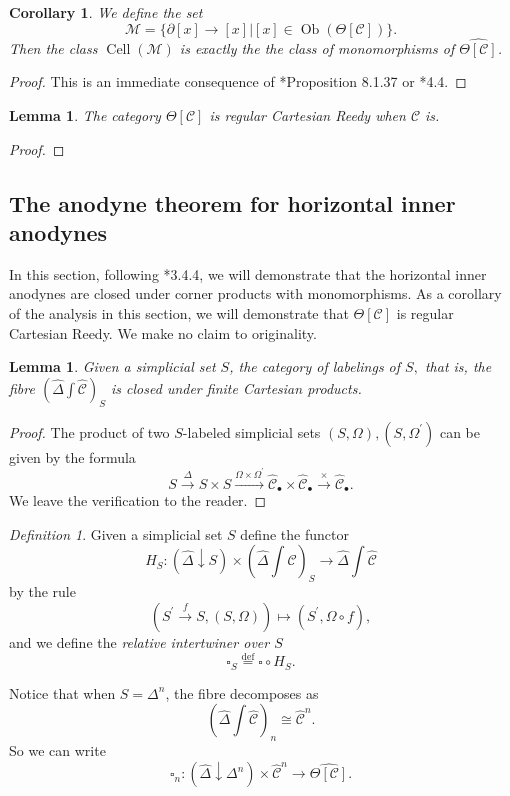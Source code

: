 \documentclass[leqno]{article}
\numberwithin{equation}{subsection}
\theoremstyle{plain}   %
\newtheorem{cor}[equation]{Corollary}
\newtheorem{lemma}[equation]{Lemma}
\theoremstyle{remark}
\newtheorem{defn}[equation]{Definition}
\theoremstyle{plain}
\DeclareMathOperator{\Ob}{Ob}
\newcommand{\overcat}[2]{{\left(#1\downarrow #2\right)}}
\newcommand{\psh}[1]{\ensuremath{\widehat{#1}}}
\renewcommand{\C}{\ensuremath{\mathcal{C}}}
\newcommand{\defeq}{\overset{\mathrm{def}}=}
\newcommand{\cellset}{\ensuremath{\widehat{\Theta[\mathcal{C}]}}}
\newcommand{\ssetlab}{\ensuremath{\widehat{\Delta} \int \widehat{\mathcal{C}}}}
\begin{document}
\begin{cor} 
	We define the set
	\[\mathscr{M}=\{\partial[x] \to [x]| [x]\in \Ob(\Theta[\C])\}.\]  Then the class \(\operatorname{Cell}(\mathscr{M})\) is exactly the the class of monomorphisms of \(\cellset\).  
\end{cor}
\begin{proof}
	This is an immediate consequence of \cite{cisinski-book}*{Proposition 8.1.37} or \cite{bergner-rezk-reedy}*{4.4}.
\end{proof}
\begin{lemma} The category \(\Theta[\C]\) is regular Cartesian Reedy when \(\C\) is.
\end{lemma}
\begin{proof}
\end{proof}

\subsection{The anodyne theorem for horizontal inner anodynes}\label{horizontal}
In this section, following \cite{oury}*{3.4.4}, we will demonstrate that the horizontal inner anodynes are closed under corner products with monomorphisms.  As a corollary of the analysis in this section, we will demonstrate that \(\Theta[\C]\) is regular Cartesian Reedy.  We make no claim to originality.

\begin{lemma} Given a simplicial set \(S\), the category of labelings of \(S,\) that is, the fibre \(\left(\ssetlab\right)_S\) is closed under finite Cartesian products. 
\end{lemma}
\begin{proof} The product of two \(S\)-labeled simplicial sets \((S,\Omega), (S,\Omega^\prime)\) can be given by the formula 
	\[S\xrightarrow{\Delta} S\times S \xrightarrow{\Omega\times \Omega^\prime}  \psh{\C}_\bullet \times \psh{\C}_\bullet \xrightarrow{\times} \psh{\C}_\bullet.\]  We leave the verification to the reader.
\end{proof}

\begin{defn} Given a simplicial set \(S\) define the functor 
	\[H_S: \overcat{\psh{\Delta}}{S} \times  \left(\ssetlab\right)_S \to \ssetlab\]
	by the rule
	\[\left(S^\prime \xrightarrow{f} S, (S,\Omega)\right) \mapsto (S^\prime,  \Omega\circ f),\]
	and we define the \emph{relative intertwiner over \(S\)}
	\[\square_S \defeq \square \circ H_S.\]
	
	Notice that when \(S=\Delta^n\), the fibre decomposes as \[\left(\ssetlab\right)_n\cong \psh{\C}^n.\] So we can write 
	\[\square_n:\overcat{\psh{\Delta}}{\Delta^n} \times \psh{\C}^n \to \cellset.\]
\end{defn}
\end{document}
